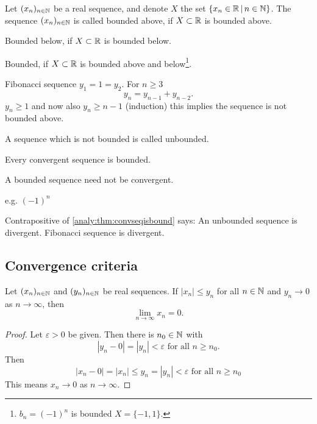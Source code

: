 \documentclass[10pt, a4paper]{article}
\newcommand{\seq}[1][x]{(#1_n)_{n \in \N}}
\begin{document}
\begin{definition}
    Let $\seq$ be a real sequence,
    and denote $X$ the set $\{x_n \in \mathbb{R} \,|\, n \in \mathbb{N}\}$.
    The sequence $\seq$ is called bounded above,
    if $X \subset \mathbb{R}$ is bounded above.

    Bounded below, if $X \subset \mathbb{R}$ is bounded below.

    Bounded, if $X \subset \mathbb{R}$ is bounded above and below\footnote{$b_n = (-1) ^ n$ is bounded $X = \{-1, 1\}$.}.
\end{definition}

\begin{example}
    Fibonacci sequence
    $y_1 = 1 = y_2$.
    For $n \geq 3$
    \[
    y_n = y_{n - 1} + y_{n - 2}.
    \]
    $y_n \geq 1$ and now also $y_n \geq n - 1$ (induction)
    this implies the sequence is not bounded above.
\end{example}
A sequence which is not bounded is called unbounded.

\begin{theorem}\label{analy:thm:convseqisbound}
    Every convergent sequence is bounded.
\end{theorem}
\begin{remark}
    A bounded sequence need not be convergent.
    
    e.g. $(-1) ^ n$
\end{remark}

Contrapositive of \autoref{analy:thm:convseqisbound} says:
An unbounded sequence is divergent.
Fibonacci sequence is divergent.

\subsection{Convergence criteria}
\begin{theorem}\label{analy:thm:squeezethm}
    Let $\seq$ and $\seq[y]$ be real sequences.
    If $|x_n| \leq y_n$ for all $n \in \mathbb{N}$ and $y_n \rightarrow 0$ as $n \rightarrow \infty$, then
    \[
    \lim_{n \rightarrow \infty}x_n = 0.
    \]
    \begin{proof}
        Let $\varepsilon > 0$ be given.
        Then there is $n_0 \in \mathbb{N}$ with
        \[
        |y_n - 0| = |y_n| < \varepsilon\text{ for all } n \geq n_0.
        \]
        Then
        \[
        |x_n - 0| = |x_n| \leq y_n = |y_n| < \varepsilon\text{ for all } n \geq n_0
        \]
        This means $x_n \rightarrow 0$ as $n \rightarrow \infty$.
    \end{proof}
\end{theorem}
\end{document}
